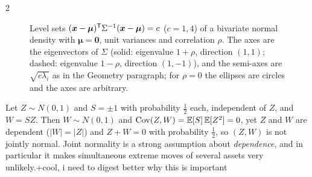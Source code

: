\begin{paracol}{2}
\begin{figure}[!htb]
\centering
{}
\caption{Level sets $(\bm x-\bm\mu)^{\mathsf T}\Sigma^{-1}(\bm x-\bm\mu)=c$ ($c=1,4$) of a bivariate normal density with $\bm\mu=\bm0$,
unit variances and correlation $\rho$. The axes are the eigenvectors of $\Sigma$ (solid: eigenvalue $1+\rho$, direction $(1,1)$;
dashed: eigenvalue $1-\rho$, direction $(1,-1)$), and the semi-axes are $\sqrt{c\lambda_i}$ as in the Geometry paragraph; for $\rho=0$ the
ellipses are circles and the axes are arbitrary.}\label{ch03:fig-mvn}
\end{figure}

\begin{remark}
Let $Z\sim N(0,1)$ and $S=\pm1$ with probability $\frac12$ each, independent of $Z$, and $W=SZ$. Then $W\sim N(0,1)$ and
$\operatorname{Cov}(Z,W)=\mathbb{E}[S]\,\mathbb{E}[Z^2]=0$, yet $Z$ and $W$ are dependent ($|W|=|Z|$) and $Z+W=0$ with probability $\frac12$, so
$(Z,W)$ is not jointly normal. Joint normality is a strong assumption about \emph{dependence}, and in
particular it makes simultaneous extreme moves of several assets very unlikely.\note+{cool, i need to digest better why this is important}
\end{remark}


\end{paracol}
